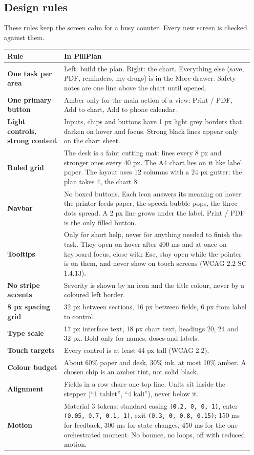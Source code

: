 \documentclass[11pt]{article}
\begin{document}
\subsection{Design rules}
These rules keep the screen calm for a busy counter. Every new screen is checked against them.
\begin{tabularx}{\linewidth}{@{}>{\bfseries}p{40mm}X@{}}
\toprule
Rule & In PillPlan \\
\midrule
One task per area & Left: build the plan. Right: the chart. Everything else (save, PDF, reminders, my drugs) is in the More drawer. Safety notes are one line above the chart until opened. \\
One primary button & Amber only for the main action of a view: Print / PDF, Add to chart, Add to phone calendar. \\
Light controls, strong content & Inputs, chips and buttons have 1 px light grey borders that darken on hover and focus. Strong black lines appear only on the chart sheet. \\
Ruled grid & The desk is a faint cutting mat: lines every 8 px and stronger ones every 40 px. The A4 chart lies on it like label paper. The layout uses 12 columns with a 24 px gutter: the plan takes 4, the chart 8. \\
Navbar & No boxed buttons. Each icon answers its meaning on hover: the printer feeds paper, the speech bubble pops, the three dots spread. A 2 px line grows under the label. Print / PDF is the only filled button. \\
Tooltips & Only for short help, never for anything needed to finish the task. They open on hover after 400 ms and at once on keyboard focus, close with Esc, stay open while the pointer is on them, and never show on touch screens (WCAG 2.2 SC 1.4.13). \\
No stripe accents & Severity is shown by an icon and the title colour, never by a coloured left border. \\
8 px spacing grid & 32 px between sections, 16 px between fields, 6 px from label to control. \\
Type scale & 17 px interface text, 18 px chart text, headings 20, 24 and 32 px. Bold only for names, doses and labels. \\
Touch targets & Every control is at least 44 px tall (WCAG 2.2). \\
Colour budget & About 60\% paper and desk, 30\% ink, at most 10\% amber. A chosen chip is an amber tint, not solid black. \\
Alignment & Fields in a row share one top line. Units sit inside the stepper (``1 tablet'', ``4 kali''), never below it. \\
Motion & Material 3 tokens: standard easing \texttt{(0.2, 0, 0, 1)}, enter \texttt{(0.05, 0.7, 0.1, 1)}, exit \texttt{(0.3, 0, 0.8, 0.15)}; 150 ms for feedback, 300 ms for state changes, 450 ms for the one orchestrated moment. No bounce, no loops, off with reduced motion. \\
\bottomrule
\end{tabularx}
\end{document}
